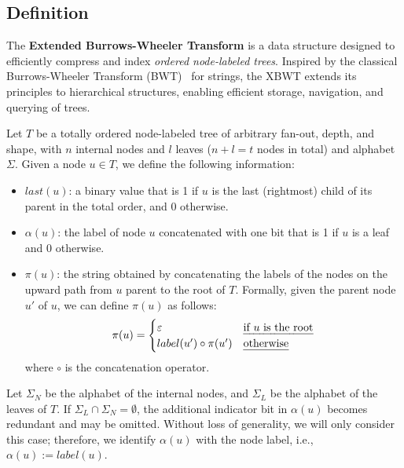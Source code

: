 \subsection{Definition}
The \textbf{Extended Burrows-Wheeler Transform} is a data structure designed to efficiently compress and index \emph{ordered node-labeled trees}. Inspired by the classical Burrows-Wheeler Transform (BWT)~\cite{burrows1994block} for strings, the XBWT extends its principles to hierarchical structures, enabling efficient storage, navigation, and querying of trees. %

\begin{definition}
    \label{def:node_informations}
    Let $T$ be a totally ordered node-labeled tree of arbitrary fan-out, depth, and shape, with $n$ internal nodes and $l$ leaves ($n + l = t$ nodes in total) and alphabet $\Sigma$. Given a node $u \in T$, we define the following information:
    \begin{itemize}
        \item $last(u)$: a binary value that is 1 if $u$ is the last (rightmost) child of its parent in the total order, and 0 otherwise.
        \item $\alpha(u)$: the label of node $u$ concatenated with one bit that is 1 if $u$ is a leaf and 0 otherwise.
        \item $\pi(u)$: the string obtained by concatenating the labels of the nodes on the upward path from $u$ parent to the root of $T$. Formally, given the parent node $u'$ of $u$, we can define $\pi(u)$ as follows:
        \begin{align*}
            \pi(u) = \begin{cases}
                \varepsilon & \text{\emph{if $u$ is the root}} \\
                label(u') \circ \pi(u') & \text{\emph{otherwise}}
            \end{cases}
        \end{align*}
        where $\circ$ is the concatenation operator.
    \end{itemize}
\end{definition}
Let $\Sigma_N$ be the alphabet of the internal nodes, and $\Sigma_L$ be the alphabet of the leaves of $T$.
If $\Sigma_L \cap \Sigma_N = \emptyset$, the additional indicator bit in $\alpha(u)$ becomes redundant and may be omitted.
Without loss of generality, we will only consider this case; therefore, we identify $\alpha(u)$ with the node label, i.e., $\alpha(u) := label(u)$.


